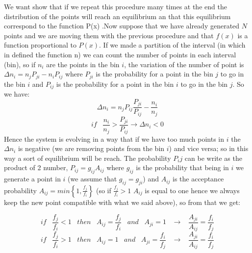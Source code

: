 We want show that if we repeat this procedure many times at the end the distribution of the points will reach an equilibrium an that this equilibrium correspond to the function P(x) .Now suppose that we have already generated $N$ points and we are moving them with the previous procedure and that $f(x)$ is a function proportional to $P(x)$. If we made a partition of the interval (in which in defined the function n) we can count the number of points in each interval (bin), so if $n_i$ are the points in the bin $i$, the variation of the number of point is $ \Delta n_i = n_j P_{ji} - n_i P_{ij}$ where $P_{ji}$ is the probability for a point in the bin $j$ to go in the bin $i$ and $P_{ij}$ is the probability for a point in the bin $i$ to go in the bin $j$. So we have: 
\[\Delta n_i = n_j P_{ij} \frac{P_{ji}}{P_{ij}} - \frac{n_i}{n_j}\]
\[ if \hspace{10pt} \frac{n_i}{n_j} > \frac{P_{ji}}{P_{ij}} \to \Delta n_i < 0 \]
Hence the system is evolving in a way that if we have too much points in $i$ the $\Delta n_i$ is negative (we are removing points from the bin $i$) and vice versa; so in this way a sort of equilibrium will be reach.
The probability $P_ij$ can be write as the product of 2 number, $ P_{ij} = g_{ij} A_{ij } $ where $g_{ij}$ is the probability that being in $i$ we generate a point in $i$ (we assume that $ g_{ij} = g_{ji} $) and $A_{ij}$ is the acceptance probability $A_{ij} = min \left\{1, \frac{f_j}{f_i} \right\}$ (so if $\frac{f_j}{f_i} > 1$ $A_{ij}$ is equal to one hence we always keep the new point compatible with what we said above), so from that we get:

\[ if \hspace{10pt} \frac{f_j}{f_i} < 1 \hspace{10pt} then \hspace{10pt}  A_{ij} = \frac{f_j}{f_i} \hspace{10pt} and \hspace{10pt} A_{ji} = 1 \hspace{10pt}\to \hspace{10pt} \frac{A_{ji}}{A_{ij}} = \frac{f_i}{f_j} \]
\[ if \hspace{10pt} \frac{f_j}{f_i} > 1 \hspace{10pt} then \hspace{10pt} A_{ij} = 1 \hspace{10pt} and \hspace{10pt} A_{ji} = \frac{f_i}{f_j} \hspace{10pt} \to \hspace{10pt} \frac{A_{ji}}{A_{ij}} = \frac{f_i}{f_j} \]


